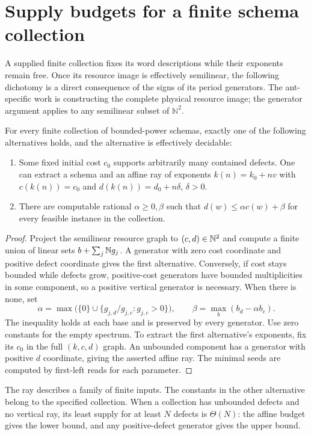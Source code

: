 \section{Supply budgets for a finite schema collection}\label{sec:supply}
A supplied finite collection fixes its word descriptions while their exponents
remain free. Once its resource image is effectively semilinear, the following
dichotomy is a direct consequence of the signs of its period generators.
The ant-specific work is constructing the complete physical resource image;
the generator argument applies to any semilinear subset of $\mathbb N^2$.

\begin{theorem}
For every finite collection of bounded-power schemas, exactly one of the
following alternatives holds, and the alternative is effectively decidable:
\begin{enumerate}
\item Some fixed initial cost $c_0$ supports arbitrarily many contained defects.
One can extract a schema and an affine ray of exponents
$k(n)=k_0+nv$ with $c(k(n))=c_0$ and $d(k(n))=d_0+n\delta$, $\delta>0$.
\item There are computable rational $\alpha\ge0,\beta$ such that
$d(w)\le\alpha c(w)+\beta$ for every feasible instance in the collection.
\end{enumerate}
\end{theorem}
\begin{proof}
Project the semilinear resource graph to $(c,d)\in\mathbb N^2$ and compute a finite
union of linear sets $b+\sum_j\mathbb N g_j$. A generator with zero cost coordinate
and positive defect coordinate gives the first alternative. Conversely, if
cost stays bounded while defects grow, positive-cost generators have bounded
multiplicities in some component, so a positive vertical generator is necessary.
When there is none, set
\[
 \alpha=\max\bigl(\{0\}\cup\{g_{j,d}/g_{j,c}:g_{j,c}>0\}\bigr),\qquad
 \beta=\max_b(b_d-\alpha b_c).
\]
The inequality holds at each base and is preserved by every generator.
Use zero constants for the empty spectrum. To extract the first alternative's
exponents, fix its $c_0$ in the full $(k,c,d)$ graph. An unbounded component
has a generator with positive $d$ coordinate, giving the asserted affine ray.
The minimal seeds are computed by first-left reads for each parameter.
\end{proof}
The ray describes a family of finite inputs. The constants in the other
alternative belong to the specified collection. When a collection has
unbounded defects and no vertical ray, its least supply for at least $N$
defects is $\Theta(N)$: the affine budget gives the lower bound, and any
positive-defect generator gives the upper bound.

